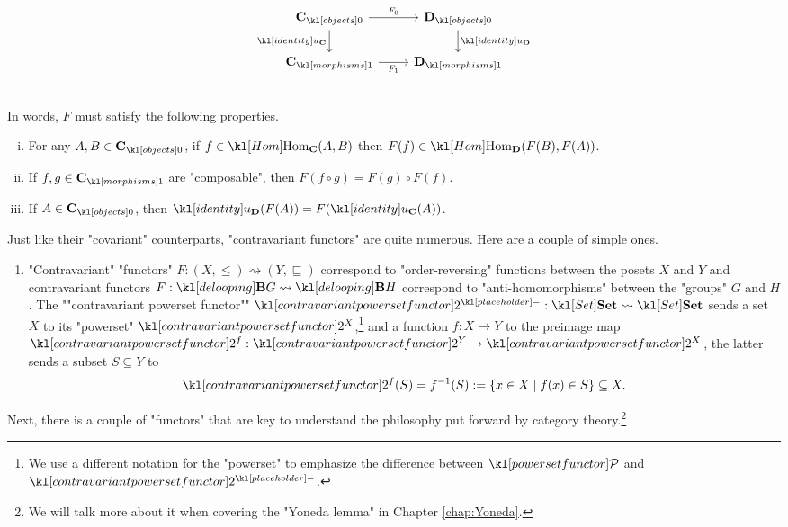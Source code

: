 \documentclass[main.tex]{subfiles}
\begin{document}
\begin{defn}
\begin{minipage}{0.49\textwidth}
\begin{equation}
		\begin{tikzcd}
		\obj{\mathbf{C}} \arrow[d, "\idu_{\mathbf{C}}"'] \arrow[r, "F_0"] & \obj{\mathbf{D}} \arrow[d, "\idu_{\mathbf{D}}"] \\
		\mor{\mathbf{C}} \arrow[r, "F_1"'] & \mor{\mathbf{D}}
		\end{tikzcd}
		\end{equation}
	\end{minipage}\\
	In words, $F$ must satisfy the following properties.
	\begin{enumerate}[i.]
		\item For any $A, B \in \obj{\mathbf{C}}$, if $f \in \Hom_{\mathbf{C}}(A,B)$ then $F(f) \in \Hom_{\mathbf{D}}(F(B), F(A))$.
		\item If $f,g \in \mor{\mathbf{C}}$ are "composable", then $F(f\circ g) = F(g) \circ F(f)$.
		\item If $A \in \obj{\mathbf{C}}$, then $\idu_{\mathbf{D}}(F(A)) = F(\idu_{\mathbf{C}}(A))$.
	\end{enumerate}
\end{defn}
\begin{exmps}
	Just like their "covariant" counterparts, "contravariant functors" are quite numerous. Here are a couple of simple ones.
	\begin{enumerate}
		\item "Contravariant" "functors" $F: (X, \leq) \rightsquigarrow (Y, \sqsubseteq)$ correspond to "order-reversing" functions between the posets $X$ and $Y$ and contravariant functors $F: \deloop{G}\rightsquigarrow \deloop{H}$ correspond to "anti-homomorphisms" between the "groups" $G$ and $H$.
		\itemAP The ""contravariant powerset functor"" $\mPcontr{\placeholder}: \catSet \rightsquigarrow \catSet$ sends a set $X$ to its "powerset" $\mPcontr{X}$,\footnote{We use a different notation for the "powerset" to emphasize the difference between $\mPcov$ and $\mPcontr{\placeholder}$.} and a function $f: X\rightarrow Y$ to the preimage map $\mPcontr{f}:\mPcontr{Y}\rightarrow \mPcontr{X}$, the latter sends a subset $S\subseteq Y$ to \[\mPcontr{f}(S) = f^{-1}(S) := \{x \in X \mid f(x) \in S\} \subseteq X.\]
	\end{enumerate}
\end{exmps}
Next, there is a couple of "functors" that are key to understand the philosophy put forward by category theory.\footnote{We will talk more about it when covering the "Yoneda lemma" in Chapter \ref{chap:Yoneda}.}
\end{document}
